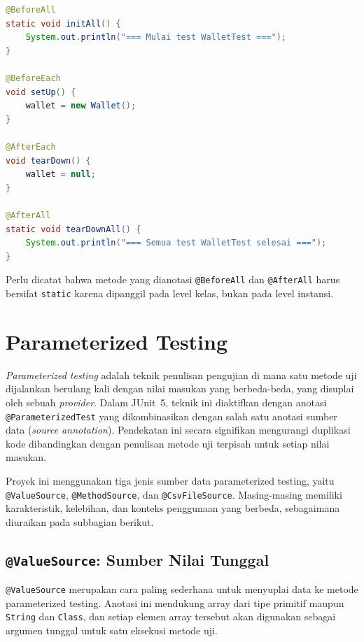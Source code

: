 \documentclass[12pt,a4paper]{article}
\begin{document}
\begin{lstlisting}[language=Java, caption={Anotasi siklus hidup pada \texttt{WalletTest}}]
@BeforeAll
static void initAll() {
    System.out.println("=== Mulai test WalletTest ===");
}

@BeforeEach
void setUp() {
    wallet = new Wallet();
}

@AfterEach
void tearDown() {
    wallet = null;
}

@AfterAll
static void tearDownAll() {
    System.out.println("=== Semua test WalletTest selesai ===");
}
\end{lstlisting}

Perlu dicatat bahwa metode yang dianotasi \texttt{@BeforeAll} dan \texttt{@AfterAll}
harus bersifat \texttt{static} karena dipanggil pada level kelas, bukan pada level
instansi.

\section{Parameterized Testing}

\textit{Parameterized testing} adalah teknik penulisan pengujian di mana satu metode uji
dijalankan berulang kali dengan nilai masukan yang berbeda-beda, yang disuplai oleh sebuah
\textit{provider}.  Dalam JUnit~5, teknik ini diaktifkan dengan anotasi
\texttt{@ParameterizedTest} yang dikombinasikan dengan salah satu anotasi sumber data
(\textit{source annotation}).  Pendekatan ini secara signifikan mengurangi duplikasi kode
dibandingkan dengan penulisan metode uji terpisah untuk setiap nilai masukan.

Proyek ini menggunakan tiga jenis sumber data parameterized testing, yaitu
\texttt{@ValueSource}, \texttt{@MethodSource}, dan \texttt{@CsvFileSource}.  Masing-masing
memiliki karakteristik, kelebihan, dan konteks penggunaan yang berbeda, sebagaimana
diuraikan pada subbagian berikut.

\subsection{\texttt{@ValueSource}: Sumber Nilai Tunggal}

\texttt{@ValueSource} merupakan cara paling sederhana untuk menyuplai data ke metode
parameterized testing.  Anotasi ini mendukung array dari tipe primitif maupun
\texttt{String} dan \texttt{Class}, dan setiap elemen array tersebut akan digunakan
sebagai argumen tunggal untuk satu eksekusi metode uji.
\end{document}
